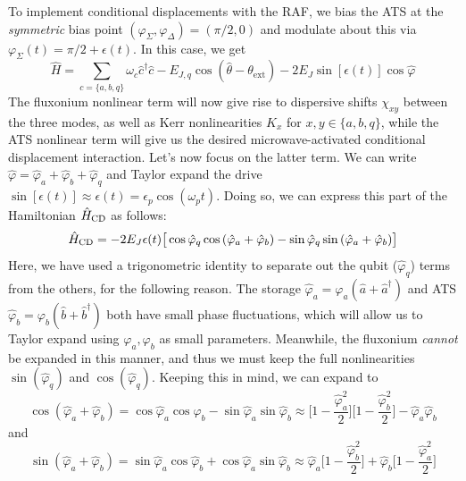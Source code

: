 To implement conditional displacements with the RAF, we bias the ATS at the \textit{symmetric} bias point $(\varphi_\Sigma, \varphi_\Delta) = (\pi/2, 0)$ and modulate about this via $\varphi_\Sigma(t) = \pi/2 + \epsilon(t)$. In this case, we get
\begin{equation}
    \hat{H} = \sum_{c = \{a, b, q\}}\omega_c \hat{c}^\dagger \hat{c} - E_{J,q}\cos(\hat{\theta}-\theta_\mathrm{ext}) - 2E_J \sin[\epsilon(t)]\cos\hat{\varphi}
    \label{eq:RAF_H_biaspoint}
\end{equation}
The fluxonium nonlinear term will now give rise to dispersive shifts $\chi_{xy}$ between the three modes, as well as Kerr nonlinearities $K_x$ for $x, y \in \{a, b, q\}$, while the ATS nonlinear term will give us the desired microwave-activated conditional displacement interaction. Let's now focus on the latter term. We can write $\hat{\varphi} = \hat{\varphi}_a + \hat{\varphi}_b + \hat{\varphi}_q$ and Taylor expand the drive $\sin[\epsilon(t)] \approx \epsilon(t) = \epsilon_p\cos(\omega_p t)$. Doing so, we can express this part of the Hamiltonian $\hat{H}_{\rm CD}$ as follows:
\begin{equation}
    \hat{H}_{\rm CD} = - 2E_J\epsilon(t)\big[\cos\hat{\varphi}_q\cos{(\hat{\varphi}_a + \hat{\varphi}_b)} - \sin\hat{\varphi}_q\sin{(\hat{\varphi}_a + \hat{\varphi}_b)}\big]
    \label{eq:RAF_HCD_expanded}
\end{equation}
Here, we have used a trigonometric identity to separate out the qubit ($\hat{\varphi}_q$) terms from the others, for the following reason. The storage $\hat{\varphi}_a = \varphi_a(\hat{a} + \hat{a}^\dagger)$ and ATS $\hat{\varphi}_b= \varphi_b(\hat{b} + \hat{b}^\dagger)$ both have small phase fluctuations, which will allow us to Taylor expand using $\varphi_a, \varphi_b$ as small parameters. Meanwhile, the fluxonium \textit{cannot} be expanded in this manner, and thus we must keep the full nonlinearities $\sin(\hat{\varphi}_q)$ and $\cos(\hat{\varphi}_q)$. Keeping this in mind, we can expand to 
\begin{equation*}
    \cos{(\hat{\varphi}_a + \hat{\varphi}_b)} = \cos\hat{\varphi}_a\cos \hat{\varphi}_b - \sin\hat{\varphi}_a\sin \hat{\varphi}_b \approx \bigg[1 - \frac{\hat{\varphi}_a^2}{2}\bigg]\bigg[1 - \frac{\hat{\varphi}_b^2}{2}\bigg] - \hat{\varphi}_a\hat{\varphi}_b
\end{equation*}
and 
\begin{equation*}
    \sin{(\hat{\varphi}_a + \hat{\varphi}_b)} = \sin\hat{\varphi}_a\cos \hat{\varphi}_b + \cos\hat{\varphi}_a\sin \hat{\varphi}_b \approx \hat{\varphi}_a\bigg[1 - \frac{\hat{\varphi}_b^2}{2}\bigg] + \hat{\varphi}_b\bigg[1 - \frac{\hat{\varphi}_a^2}{2}\bigg]
\end{equation*}
